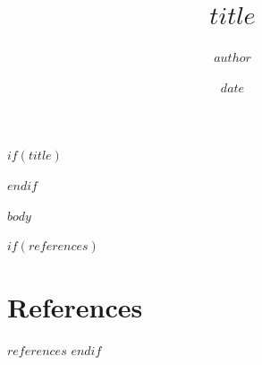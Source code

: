 \documentclass[11pt,a4paper]{article}
\title{$title$}
\author{$author$}
\date{$date$}
\begin{document}
$if(title)$
\maketitle
$endif$

$body$

$if(references)$
\section*{References}
$references$
$endif$
\end{document}
